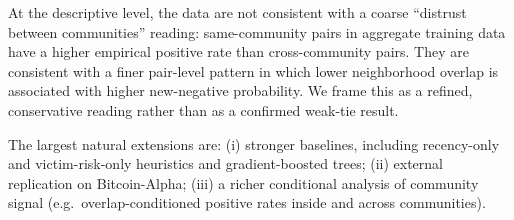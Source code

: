 At the descriptive level, the data are not consistent with a coarse
``distrust between communities'' reading: same-community pairs in
aggregate training data have a higher empirical positive rate than
cross-community pairs. They are consistent with a finer pair-level
pattern in which lower neighborhood overlap is associated with
higher new-negative probability. We frame this as a refined,
conservative reading rather than as a confirmed weak-tie result.

The largest natural extensions are: (i) stronger baselines,
including recency-only and victim-risk-only heuristics and
gradient-boosted trees; (ii) external replication on Bitcoin-Alpha;
(iii) a richer conditional analysis of community signal (e.g.\
overlap-conditioned positive rates inside and across communities).
